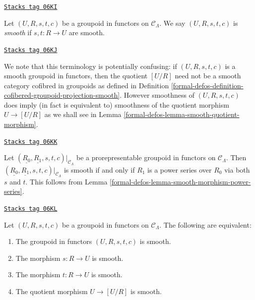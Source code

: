 \begin{definition}
\label{formal-defos-definition-smooth-groupoid-in-functors}
\href{https://stacks.math.columbia.edu/tag/06KI}{\texttt{Stacks tag 06KI}}

Let $(U, R, s, t, c)$ be a groupoid in functors on $\mathcal{C}_\Lambda$. We
say $(U, R, s, t, c)$ is {\it smooth} if $s, t: R \to U$ are smooth.
\end{definition}

\begin{remark}
\label{formal-defos-remark-smooth-groupoid-in-functors-warning}
\href{https://stacks.math.columbia.edu/tag/06KJ}{\texttt{Stacks tag 06KJ}}

We note that this terminology is potentially confusing:
if $(U, R, s, t, c)$ is a smooth groupoid in functors, then the quotient
$[U/R]$ need not be a smooth category cofibred in groupoids as defined in
Definition \ref{formal-defos-definition-cofibered-groupoid-projection-smooth}.
However smoothness of $(U, R, s, t, c)$ does imply (in fact is equivalent to)
smoothness of the quotient morphism $U \to [U/R]$ as we shall
see in
Lemma \ref{formal-defos-lemma-smooth-quotient-morphism}.
\end{remark}

\begin{remark}
\label{formal-defos-remark-smooth-power-series-prorepresentable-smooth-groupoid-in-functors}
\href{https://stacks.math.columbia.edu/tag/06KK}{\texttt{Stacks tag 06KK}}

Let $(\underline{R_0}, \underline{R_1}, s, t, c)|_{\mathcal{C}_\Lambda}$
be a prorepresentable groupoid in functors on $\mathcal{C}_\Lambda$.
Then $(\underline{R_0}, \underline{R_1}, s, t, c)|_{\mathcal{C}_\Lambda}$
is smooth if and only if $R_1$ is a power series over $R_0$ via both $s$
and $t$. This follows from
Lemma \ref{formal-defos-lemma-smooth-morphism-power-series}.
\end{remark}

\begin{lemma}
\label{formal-defos-lemma-smooth-quotient-morphism}
\href{https://stacks.math.columbia.edu/tag/06KL}{\texttt{Stacks tag 06KL}}

Let $(U, R, s, t, c)$ be a groupoid in functors on $\mathcal{C}_\Lambda$.
The following are equivalent:
\begin{enumerate}
\item The groupoid in functors $(U, R, s, t, c)$ is smooth.
\item The morphism $s : R \to U$ is smooth.
\item The morphism $t : R \to U$ is smooth.
\item The quotient morphism $U \to [U/R]$ is smooth.
\end{enumerate}
\end{lemma}

